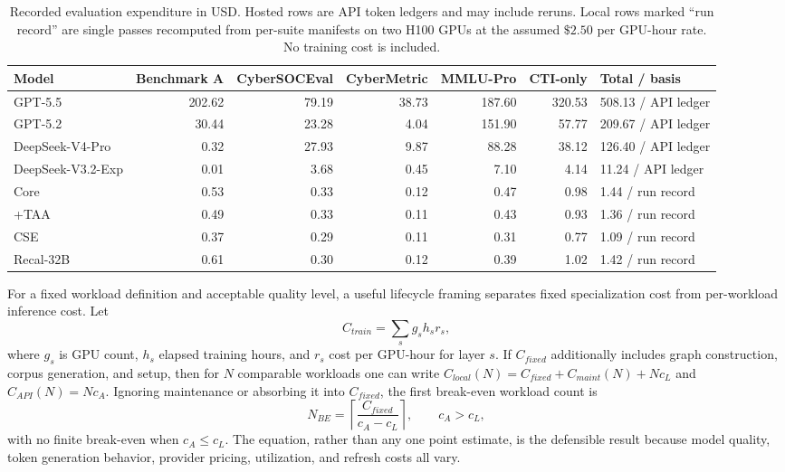 \documentclass[conference]{IEEEtran}
\begin{document}
\begin{table}[t]
\caption{Recorded evaluation expenditure in USD. Hosted rows are API token ledgers and may include reruns. Local rows marked ``run record'' are single passes recomputed from per-suite manifests on two H100 GPUs at the assumed $\$2.50$ per GPU-hour rate. No training cost is included.}
\label{tab:cost}
\centering
\scriptsize
\setlength{\tabcolsep}{3.8pt}
\begin{tabular}{@{}lrrrrrl@{}}
\toprule
Model & Benchmark A & CyberSOCEval & CyberMetric & MMLU-Pro & CTI-only & Total / basis \\
\midrule
GPT-5.5 & 202.62 & 79.19 & 38.73 & 187.60 & 320.53 & 508.13 / API ledger \\
GPT-5.2 & 30.44 & 23.28 & 4.04 & 151.90 & 57.77 & 209.67 / API ledger \\
DeepSeek-V4-Pro & 0.32 & 27.93 & 9.87 & 88.28 & 38.12 & 126.40 / API ledger \\
DeepSeek-V3.2-Exp & 0.01 & 3.68 & 0.45 & 7.10 & 4.14 & 11.24 / API ledger \\
Core & 0.53 & 0.33 & 0.12 & 0.47 & 0.98 & 1.44 / run record \\
+TAA & 0.49 & 0.33 & 0.11 & 0.43 & 0.93 & 1.36 / run record \\
CSE & 0.37 & 0.29 & 0.11 & 0.31 & 0.77 & 1.09 / run record \\
Recal-32B & 0.61 & 0.30 & 0.12 & 0.39 & 1.02 & 1.42 / run record \\
\bottomrule
\end{tabular}
\end{table}

For a fixed workload definition and acceptable quality level, a useful lifecycle framing separates fixed specialization cost from per-workload inference cost. Let
\begin{equation}
C_{train}=\sum_s g_s h_s r_s,
\end{equation}
where $g_s$ is GPU count, $h_s$ elapsed training hours, and $r_s$ cost per GPU-hour for layer $s$. If $C_{fixed}$ additionally includes graph construction, corpus generation, and setup, then for $N$ comparable workloads one can write $C_{local}(N)=C_{fixed}+C_{maint}(N)+Nc_L$ and $C_{API}(N)=Nc_A$. Ignoring maintenance or absorbing it into $C_{fixed}$, the first break-even workload count is
\begin{equation}
N_{BE}=\left\lceil\frac{C_{fixed}}{c_A-c_L}\right\rceil,\qquad c_A>c_L,
\end{equation}
with no finite break-even when $c_A\le c_L$. The equation, rather than any one point estimate, is the defensible result because model quality, token generation behavior, provider pricing, utilization, and refresh costs all vary.
\end{document}

